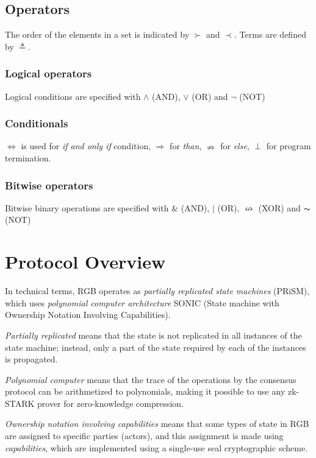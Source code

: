 \documentclass[9pt,oneside]{amsart}
\begin{document}
\begin{multicols}{2}
\subsection{Operators}
The order of the elements in a set is indicated by $\succ$ and $\prec$.
Terms are defined by $\triangleq$.

\subsubsection{Logical operators}
Logical conditions are specified with $\land$ (AND), $\lor$ (OR) and $\lnot$ (NOT)

\subsubsection{Conditionals}
$\Longleftrightarrow$ is used for \emph{if and only if} condition,
$\Rightarrow$ for \emph{than}, $\nRightarrow$ for \emph{else}, $\perp$ for program termination.

\subsubsection{Bitwise operators}
Bitwise binary operations are specified with $\&$ (AND), $|$ (OR), $\nleftrightarrow$ (XOR) and $\thicksim$ (NOT)

\section{Protocol Overview}

In technical terms, RGB operates as \emph{partially replicated state machines} (PRiSM),
which uses \emph{polynomial computer architecture} SONIC
(State machine with Ownership Notation Involving Capabilities).

\emph{Partially replicated} means that the state is not replicated in all instances
of the state machine; instead, only a part of the state required by each of the instances
is propagated.

\emph{Polynomial computer} means that the trace of the operations by the consensus protocol
can be arithmetized to polynomials,
making it possible to use any zk-STARK prover for zero-knowledge compression.

\emph{Ownership notation involving capabilities} means that some types of state in RGB
are assigned to specific parties (actors), and this assignment is made using \emph{capabilities},
which are implemented using a single-use seal cryptographic scheme.


\end{multicols}
\end{document}
